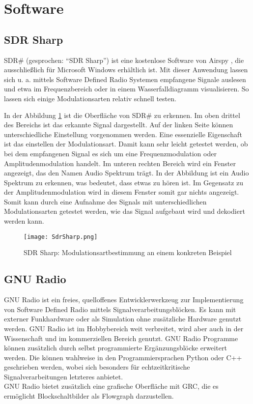 \section{Software}
\subsection{SDR Sharp}
SDR\# (gesprochen: \enquote{SDR Sharp}) ist eine kostenlose Software von Airspy \cite{airspy:2018}, die ausschließlich für Microsoft Windows erhältlich ist. Mit dieser Anwendung lassen sich u. a. mittels Software Defined Radio Systemen empfangene Signale auslesen und etwa im Frequenzbereich oder in einem Wasserfalldiagramm visualisieren.
So lassen sich einige Modulationsarten relativ schnell testen. 

In der Abbildung \ref{SDRSharp}  ist die Oberfläche von SDR\# zu erkennen. Im oben drittel des Bereichs ist das erkannte Signal dargestellt. Auf der linken Seite können unterschiedliche Einstellung vorgenommen werden. Eine essenzielle Eigenschaft ist das einstellen der Modulationsart. Damit kann sehr leicht getestet werden, ob bei dem empfangenen Signal es sich um eine Frequenzmodulation oder Amplitudenmodulation handelt. Im unteren rechten Bereich wird ein Fenster angezeigt, das den Namen Audio Spektrum trägt. In der Abbildung ist ein Audio Spektrum zu erkennen, was bedeutet, dass etwas zu hören ist. Im Gegensatz zu der Amplitudenmodulation wird in diesem Fenster somit gar nichts angezeigt. Somit kann durch eine Aufnahme des Signals mit unterschiedlichen Modulationsarten getestet werden, wie das Signal aufgebaut wird und dekodiert werden kann.

\begin{figure}[H]
	\centering
	\texttt{[image: SdrSharp.png]}
	\caption[SDR Sharp: Modulationsartbestimmung an einem konkreten Beispiel]{SDR Sharp: Modulationsartbestimmung an einem konkreten Beispiel} 
	\label{SDRSharp}
\end{figure}


\subsection{GNU Radio}
GNU Radio \cite{gnuradio} ist ein freies, quelloffenes Entwicklerwerkzeug zur Implementierung von Software Defined Radio mittels Signalverarbeitungsblöcken. Es kann mit externer Funkhardware oder als Simulation ohne zusätzliche Hardware genutzt werden. GNU Radio ist im Hobbybereich weit verbreitet, wird aber auch in der Wissenschaft und im kommerziellen Bereich genutzt. GNU Radio Programme können zusätzlich durch selbst programmierte Ergänzungsblöcke erweitert werden. Die können wahlweise in den Programmiersprachen Python oder C++ geschrieben werden, wobei sich besonders für echtzeitkritische Signalverarbeitungen letzteres anbietet.\\
GNU Radio bietet zusätzlich eine grafische Oberfläche mit \ac{GRC}, die es ermöglicht Blockschaltbilder als Flowgraph darzustellen.

